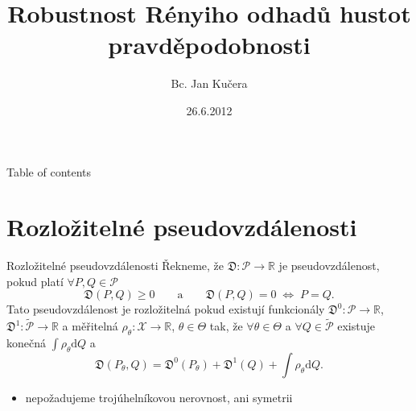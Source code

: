 \documentclass[11pt,a4paper]{beamer}
\author{Bc. Jan Kučera}
\title{Robustnost Rényiho odhadů hustot pravděpodobnosti}
\institute{FJFI, ČVUT\\ $\quad$  \\ Vedoucí práce: Ing. Václav Kůs Ph.D.}
\date{26.6.2012}
\begin{document}
\begin{frame}
	\maketitle
\end{frame}

\begin{frame}{Table of contents}
    	\tableofcontents
\end{frame}

%

\section{Rozložitelné pseudovzdálenosti} %
\begin{frame}{Rozložitelné pseudovzdálenosti}
		Řekneme, že $\mathfrak{D}:\mathcal{P} \rightarrow \mathbb{R}$ je pseudovzdálenost, pokud platí $\forall P,Q\in\mathcal{P}$
		\begin{equation*}
			\mathfrak{D}(P,Q) \geq 0  \qquad \text{a} \qquad \mathfrak{D}(P,Q)=0 \; \Leftrightarrow \; P=Q.
		\end{equation*}
		 Tato  pseudovzdálenost je  rozložitelná pokud existují funkcionály
		 $\mathfrak{D}^0:\mathcal{P}\rightarrow\mathbb{R}$, $ \mathfrak{D}^1:\mathcal{\tilde{P}} \rightarrow \mathbb{R}$ a měřitelná
		  $\rho_\theta : \mathcal{X} \rightarrow \mathbb{R}$, $ \theta \in \Theta$ tak, že $\forall \theta \in \Theta$ a $\forall Q \in \mathcal{\tilde{P}}$ existuje konečná $\int{\rho_\theta }\mathrm{d}Q$ a
		\begin{equation*}
			\mathfrak{D} (P_\theta, Q) = \mathfrak{D}^0 (P_\theta) + \mathfrak{D}^1 (Q) + \int \rho_\theta \mathrm{d}Q.
		\end{equation*}
		\begin{itemize}
			\item nepožadujeme trojúhelníkovou nerovnost, ani symetrii
		\end{itemize}			
\end{frame}
\end{document}
